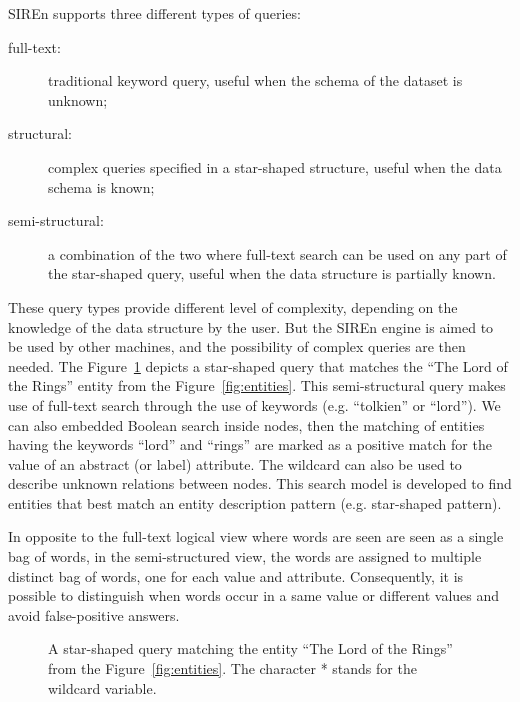 SIREn supports three different types of queries:
\begin{description}
\item[full-text:] traditional keyword query, useful when the schema of the
dataset is unknown;
\item[structural:] complex queries specified in a star-shaped structure, useful
when the data schema is known;
\item[semi-structural:] a combination of the two where full-text search can be
used on any part of the star-shaped query, useful when the data structure is partially known.
\end{description}
These query types provide different level of complexity, depending on the
knowledge of the data structure by the user. But the SIREn engine is aimed to
be used by other machines, and the possibility of complex queries are then
needed. The Figure~\ref{fig:star-query} depicts a star-shaped query that
matches the ``The Lord of the Rings'' entity from the
Figure~\ref{fig:entities}. This semi-structural query makes use of full-text
search through the use of keywords (e.g. ``tolkien'' or ``lord''). We can also
embedded Boolean search inside nodes, then the matching of entities having the
keywords ``lord'' and ``rings'' are marked as a positive match for the value
of an abstract (or label) attribute. The wildcard can also be used to describe
unknown relations between nodes. This search model is developed to find
entities that best match an entity description pattern (e.g. star-shaped
pattern).

In opposite to the full-text logical view where words are seen are seen as a
single bag of words, in the semi-structured view, the words are assigned to
multiple distinct bag of words, one for each value and attribute. Consequently,
it is possible to distinguish when words occur in a same value or different
values and avoid false-positive answers.

\begin{figure}
\centering
{}%
\caption{A star-shaped query matching the entity ``The Lord of the Rings''
from the Figure~\ref{fig:entities}. The character * stands for the wildcard
variable.}
\label{fig:star-query}
\end{figure}

